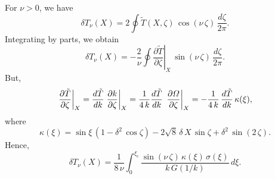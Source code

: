 \documentclass[12pt,prb,aps,notitlepage]{revtex4-1}
\begin{document}
For $\nu>0$, we have
\begin{equation}
\delta T_\nu(X) = 2\oint\tilde{T}(X,\zeta)\,\cos(\nu\,\zeta)\,\frac{d\zeta}{2\pi}.
\end{equation}
Integrating by parts, we obtain
\begin{equation}
\delta T_\nu(X) = -\frac{2}{\nu}\oint\left.\frac{\partial \tilde{T}}{\partial\zeta}\right|_X\,\sin(\nu\,\zeta)\,\frac{d\zeta}{2\pi}.
\end{equation}
But,
\begin{equation}
\left.\frac{\partial \tilde{T}}{\partial\zeta}\right|_X=\frac{d\tilde{T}}{dk}\left.\frac{\partial k}{\partial\zeta}\right|_{X}
=\frac{1}{4\,k}\frac{d\tilde{T}}{dk}\,\left.\frac{\partial {\mit\Omega}}{\partial\zeta}\right|_{X}=-\frac{1}{4\,k}\,\frac{d\tilde{T}}{dk}\,\kappa(\xi),
\end{equation}
where
\begin{equation}
\kappa(\xi) = \sin\xi\,(1-\delta^2\,\cos\zeta)  -2\sqrt{8}\,\delta\,X\,\sin\zeta +\delta^2\,\sin(2\,\zeta).
\end{equation}
Hence,
\begin{equation}
\delta T_\nu(X) =\frac{1}{8\,\nu}\int_0^{\xi_c}\frac{\sin(\nu\,\zeta)\,\kappa(\xi)\,\sigma(\xi)}{k\,G(1/k)}\,d\xi.
\end{equation}
\end{document}
